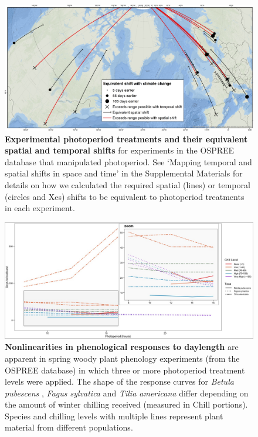 \documentclass{article}
\begin{document}
\begin{figure}[p]
\centering
\includegraphics{..//..//analyses/photoperiod/figures/ospree_photopmap_fromblake.jpg} 
\caption{\textbf{Experimental photoperiod treatments and their equivalent spatial and temporal shifts} for experiments in the OSPREE database that manipulated photoperiod. See `Mapping temporal and spatial shifts in space and time' in the Supplemental Materials for details on how we calculated the required spatial (lines) or temporal (circles and Xes) shifts to be equivalent to photoperiod treatments in each experiment.}
 \label{fig:photomap}
 \end{figure}

 
\begin{figure}[p]
\includegraphics{..//..//analyses/photoperiod/figures/Photo_curv_FINAL.jpeg} 
\caption{\textbf{Nonlinearities in phenological responses to daylength} are apparent in spring woody plant phenology experiments (from the OSPREE database) in which three or more photoperiod treatment levels were applied. The shape of the response curves for \textit{Betula pubescens} \citep{Caffarra:2011b}, \textit{Fagus sylvatica} \citep{Heide:1993a} and \textit{Tilia americana} \citep{Ashby:1962aa} differ depending on the amount of winter chilling received (measured in Chill portions). Species and chilling levels with multiple lines represent plant material from different populations.}


 \label{fig:photocurve}
 \end{figure}
\end{document}
